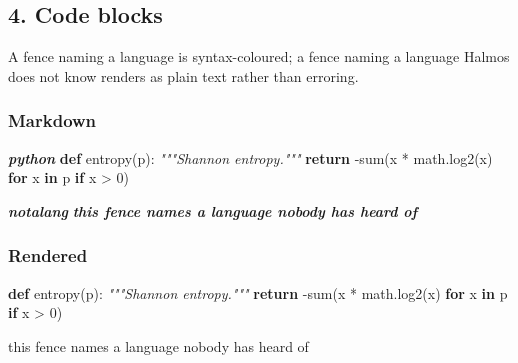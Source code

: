 \documentclass[
]{article}
\newenvironment{Shaded}{}{}
\newcommand{\BuiltInTok}[1]{\textcolor[rgb]{0.00,0.50,0.00}{#1}}
\newcommand{\CommentTok}[1]{\textcolor[rgb]{0.38,0.63,0.69}{\textit{#1}}}
\newcommand{\ControlFlowTok}[1]{\textcolor[rgb]{0.00,0.44,0.13}{\textbf{#1}}}
\newcommand{\DecValTok}[1]{\textcolor[rgb]{0.25,0.63,0.44}{#1}}
\newcommand{\InformationTok}[1]{\textcolor[rgb]{0.38,0.63,0.69}{\textbf{\textit{#1}}}}
\newcommand{\KeywordTok}[1]{\textcolor[rgb]{0.00,0.44,0.13}{\textbf{#1}}}
\newcommand{\NormalTok}[1]{#1}
\newcommand{\OperatorTok}[1]{\textcolor[rgb]{0.40,0.40,0.40}{#1}}
\begin{document}
\subsection{4. Code blocks}\label{code-blocks}

A fence naming a language is syntax-coloured; a fence naming a language
Halmos does not know renders as plain text rather than erroring.

\subsubsection{Markdown}\label{markdown-3}

\begin{Shaded}
\begin{Highlighting}[]
\InformationTok{\textasciigrave{}\textasciigrave{}\textasciigrave{}python}
\KeywordTok{def}\NormalTok{ entropy(p):}
    \CommentTok{"""Shannon entropy."""}
    \ControlFlowTok{return} \OperatorTok{{-}}\BuiltInTok{sum}\NormalTok{(x }\OperatorTok{*}\NormalTok{ math.log2(x) }\ControlFlowTok{for}\NormalTok{ x }\KeywordTok{in}\NormalTok{ p }\ControlFlowTok{if}\NormalTok{ x }\OperatorTok{\textgreater{}} \DecValTok{0}\NormalTok{)}
\InformationTok{\textasciigrave{}\textasciigrave{}\textasciigrave{}}

\InformationTok{\textasciigrave{}\textasciigrave{}\textasciigrave{}notalang}
\InformationTok{this fence names a language nobody has heard of}
\InformationTok{\textasciigrave{}\textasciigrave{}\textasciigrave{}}
\end{Highlighting}
\end{Shaded}

\subsubsection{Rendered}\label{rendered-3}

\begin{Shaded}
\begin{Highlighting}[]
\KeywordTok{def}\NormalTok{ entropy(p):}
    \CommentTok{"""Shannon entropy."""}
    \ControlFlowTok{return} \OperatorTok{{-}}\BuiltInTok{sum}\NormalTok{(x }\OperatorTok{*}\NormalTok{ math.log2(x) }\ControlFlowTok{for}\NormalTok{ x }\KeywordTok{in}\NormalTok{ p }\ControlFlowTok{if}\NormalTok{ x }\OperatorTok{\textgreater{}} \DecValTok{0}\NormalTok{)}
\end{Highlighting}
\end{Shaded}

\begin{Shaded}
\begin{Highlighting}[]
\NormalTok{this fence names a language nobody has heard of}
\end{Highlighting}
\end{Shaded}
\end{document}
